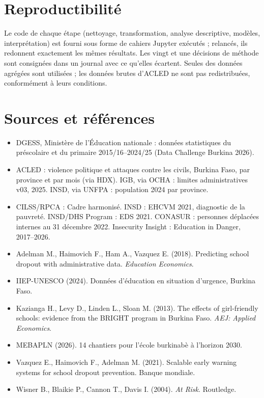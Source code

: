 \documentclass[11pt,a4paper]{article}
\begin{document}
\section{Reproductibilité}
Le code de chaque étape (nettoyage, transformation, analyse descriptive, modèles, interprétation) est fourni sous forme de cahiers Jupyter exécutés ; relancés, ils redonnent exactement les mêmes résultats. Les vingt et une décisions de méthode sont consignées dans un journal avec ce qu'elles écartent. Seules des données agrégées sont utilisées ; les données brutes d'ACLED ne sont pas redistribuées, conformément à leurs conditions.

\section*{Sources et références}
\small
\begin{itemize}[leftmargin=*]
\item DGESS, Ministère de l'Éducation nationale : données statistiques du préscolaire et du primaire 2015/16--2024/25 (Data Challenge Burkina 2026).
\item ACLED : violence politique et attaques contre les civils, Burkina Faso, par province et par mois (via HDX). IGB, via OCHA : limites administratives v03, 2025. INSD, via UNFPA : population 2024 par province.
\item CILSS/RPCA : Cadre harmonisé. INSD : EHCVM 2021, diagnostic de la pauvreté. INSD/DHS Program : EDS 2021. CONASUR : personnes déplacées internes au 31 décembre 2022. Insecurity Insight : Education in Danger, 2017--2026.
\item Adelman M., Haimovich F., Ham A., Vazquez E. (2018). Predicting school dropout with administrative data. \emph{Education Economics}.
\item IIEP-UNESCO (2024). Données d'éducation en situation d'urgence, Burkina Faso.
\item Kazianga H., Levy D., Linden L., Sloan M. (2013). The effects of girl-friendly schools: evidence from the BRIGHT program in Burkina Faso. \emph{AEJ: Applied Economics}.
\item MEBAPLN (2026). 14 chantiers pour l'école burkinabè à l'horizon 2030.
\item Vazquez E., Haimovich F., Adelman M. (2021). Scalable early warning systems for school dropout prevention. Banque mondiale.
\item Wisner B., Blaikie P., Cannon T., Davis I. (2004). \emph{At Risk}. Routledge.
\end{itemize}
\end{document}
